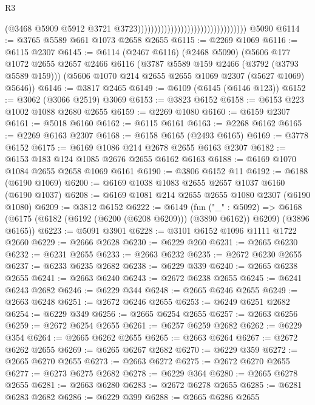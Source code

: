 \begin{lexlean}{R3}
\begin{coremodule}
                                                                    (@3468
                                                                      @5909
                                                                      @5912
                                                                      @3721
                                                                      @3723)))))))))))))))))))))))))))))))))
    @5090
@6114 := @3765 @5589 @661 @1073 @2658 @2655
@6115 := @2269 @1069
@6116 := @6115 @2307
@6145 := @6114
    (@2467 @6116)
    (@2468 @5090)
    (@5606
      @177
      @1072
      @2655
      @2657
      @2466
      @6116
      (@3787 @5589 @159 @2466 (@3792 (@3793 @5589 @159)))
      (@5606 @1070 @214 @2655 @2655 @1069 @2307 (@5627 @1069) @5646))
@6146 := @3817 @2465
@6149 := @6109 (@6145 (@6146 @123))
@6152 := @3062 (@3066 @2519) @3069
@6153 := @3823 @6152
@6158 := @6153 @223 @1002 @1088 @2680 @2655
@6159 := @2269 @1080
@6160 := @6159 @2307
@6161 := @5018 @6160
@6162 := @6115 @6161
@6163 := @2268 @6162
@6165 := @2269 @6163 @2307
@6168 := @6158 @6165 (@2493 @6165)
@6169 := @3778 @6152
@6175 := @6169 @1086 @214 @2678 @2655 @6163 @2307
@6182 := @6153 @183 @124 @1085 @2676 @2655 @6162 @6163
@6188 := @6169 @1070 @1084 @2655 @2658 @1069 @6161
@6190 := @3806 @6152 @11
@6192 := @6188 (@6190 @1069)
@6200 := @6169 @1038 @1083 @2655 @2657 @1037 @6160 (@6190 @1037)
@6208 := @6169 @1081 @214 @2655 @2655 @1080 @2307 (@6190 @1080)
@6209 := @3812 @6152
@6222 := @6149
    (fun ("_" : @5092) =>
    @6168 (@6175 (@6182 (@6192 (@6200 (@6208 @6209))) (@3890 @6162)) @6209) (@3896 @6165))
@6223 := @5091 @3901
@6228 := @3101 @6152 @1096 @1111 @1722 @2660
@6229 := @2666 @2628
@6230 := @6229 @260
@6231 := @2665 @6230
@6232 := @6231 @2655
@6233 := @2663 @6232
@6235 := @2672 @6230 @2655
@6237 := @6233 @6235 @2682
@6238 := @6229 @339
@6240 := @2665 @6238 @2655
@6241 := @2663 @6240
@6243 := @2672 @6238 @2655
@6245 := @6241 @6243 @2682
@6246 := @6229 @344
@6248 := @2665 @6246 @2655
@6249 := @2663 @6248
@6251 := @2672 @6246 @2655
@6253 := @6249 @6251 @2682
@6254 := @6229 @349
@6256 := @2665 @6254 @2655
@6257 := @2663 @6256
@6259 := @2672 @6254 @2655
@6261 := @6257 @6259 @2682
@6262 := @6229 @354
@6264 := @2665 @6262 @2655
@6265 := @2663 @6264
@6267 := @2672 @6262 @2655
@6269 := @6265 @6267 @2682
@6270 := @6229 @359
@6272 := @2665 @6270 @2655
@6273 := @2663 @6272
@6275 := @2672 @6270 @2655
@6277 := @6273 @6275 @2682
@6278 := @6229 @364
@6280 := @2665 @6278 @2655
@6281 := @2663 @6280
@6283 := @2672 @6278 @2655
@6285 := @6281 @6283 @2682
@6286 := @6229 @399
@6288 := @2665 @6286 @2655

\end{coremodule}
\end{lexlean}

